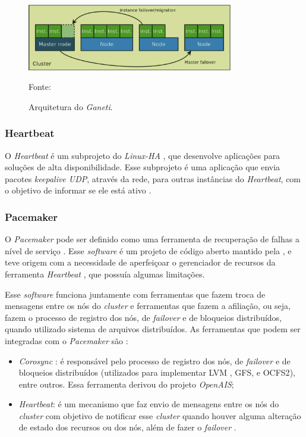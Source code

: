 \begin{figure}[h!]
 \centering
 \includegraphics[width=340px]{img/ganeti_arquitetura.eps}
 \caption{Arquitetura do \textit{Ganeti}.}
 Fonte: \citet{carvalho2011}
 \label{fig:ganeti_arquitetura}
\end{figure}


\subsubsection{Heartbeat}
\label{section:heartbeat}
O \textit{Heartbeat} é um subprojeto do \textit{Linux-HA} \cite{linuxha}, que desenvolve aplicações para soluções de alta disponibilidade.
Esse subprojeto é uma aplicação que envia pacotes \textit{keepalive \ac{UDP}}, através da rede, para outras instâncias do \textit{Heartbeat}, 
com o objetivo de informar se ele está ativo \cite{reis2009}.

\subsubsection{Pacemaker}
\label{section:pacemaker}
O \textit{Pacemaker} \cite{pacemaker} pode ser definido como uma ferramenta de recuperação de falhas a nível de serviço \cite{perkov2011}. 
Esse \textit{software} é um projeto de código aberto mantido pela \cite{clusterlabs}, e teve origem com a necessidade de aperfeiçoar o gerenciador 
de recursos da ferramenta \textit{Heartbeat} \cite{heartbeat}, que possuía algumas limitações. 

Esse \textit{software} funciona juntamente com ferramentas que fazem troca de mensagens entre os nós do \textit{cluster} e ferramentas que 
fazem a afiliação, ou seja, fazem o processo de registro dos nós, de \textit{failover} e de bloqueios distribuídos, quando utilizado sistema 
de arquivos distribuídos. As ferramentas que podem ser integradas com o \textit{Pacemaker} são \cite{pacemaker}:
\begin{itemize}
 \item \textit{Corosync} \cite{corosync}: é responsável pelo processo de registro dos nós, de \textit{failover} e de bloqueios distribuídos 
 (utilizados para implementar \ac{LVM} \cite{lvm}, \ac{GFS}, e \ac{OCFS2}), entre outros. Essa ferramenta derivou do projeto \textit{OpenAIS};
 \item \textit{Heartbeat}: é um mecanismo que faz envio de mensagens entre os nós do \textit{cluster} com objetivo de notificar esse 
 \textit{cluster} quando houver alguma alteração de estado dos recursos ou dos nós, além de fazer o \textit{failover} \cite{clusterlabs}.
\end{itemize}

